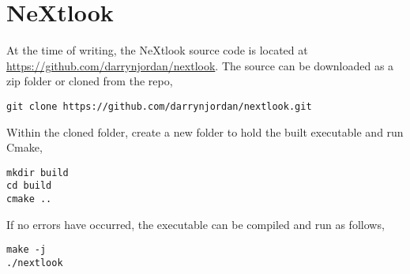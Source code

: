 \documentclass[a4paper,11pt]{report}
\begin{document}
\section{NeXtlook}
At the time of writing, the NeXtlook source code is located at \url{https://github.com/darrynjordan/nextlook}. The source can be downloaded as a zip folder or cloned from the repo,
\begin{lstlisting}
git clone https://github.com/darrynjordan/nextlook.git
\end{lstlisting}
Within the cloned folder, create a new folder to hold the built executable and run Cmake,
\begin{lstlisting}
mkdir build
cd build
cmake ..
\end{lstlisting}
If no errors have occurred, the executable can be compiled and run as follows,
\begin{lstlisting}
make -j
./nextlook
\end{lstlisting}
\end{document}
